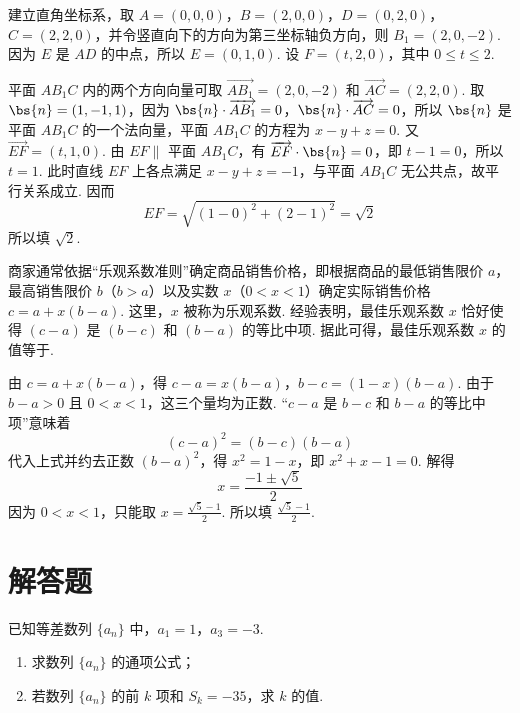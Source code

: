 
\begin{solution}
建立直角坐标系，取 \(A=(0,0,0)\)，\(B=(2,0,0)\)，\(D=(0,2,0)\)，\(C=(2,2,0)\)，并令竖直向下的方向为第三坐标轴负方向，则 \(B_1=(2,0,-2)\). 因为 \(E\) 是 \(AD\) 的中点，所以 \(E=(0,1,0)\). 设 \(F=(t,2,0)\)，其中 \(0\leqslant t\leqslant2\).

平面 \(AB_1C\) 内的两个方向向量可取 \(\overrightarrow{AB_1}=(2,0,-2)\) 和 \(\overrightarrow{AC}=(2,2,0)\). 取 \(\bs{n}=(1,-1,1)\)，因为 \(\bs{n}\cdot\overrightarrow{AB_1}=0\)，\(\bs{n}\cdot\overrightarrow{AC}=0\)，所以 \(\bs{n}\) 是平面 \(AB_1C\) 的一个法向量，平面 \(AB_1C\) 的方程为 \(x-y+z=0\). 又 \(\overrightarrow{EF}=(t,1,0)\). 由 \(EF\parallel\) 平面 \(AB_1C\)，有 \(\overrightarrow{EF}\cdot\bs{n}=0\)，即 \(t-1=0\)，所以 \(t=1\). 此时直线 \(EF\) 上各点满足 \(x-y+z=-1\)，与平面 \(AB_1C\) 无公共点，故平行关系成立. 因而
\[
EF=\sqrt{(1-0)^2+(2-1)^2}=\sqrt2
\]
所以填 \(\sqrt2\).
\end{solution}

\begin{problem}
商家通常依据“乐观系数准则”确定商品销售价格，即根据商品的最低销售限价 \(a\)，最高销售限价 \(b\)（\(b > a\)）以及实数 \(x\)（\(0 < x < 1\)）确定实际销售价格 \( c = a + x (b - a) \). 这里，\(x\) 被称为乐观系数. 经验表明，最佳乐观系数 \(x\) 恰好使得 \( (c - a) \) 是 \( (b - c) \) 和 \( (b - a) \) 的等比中项. 据此可得，最佳乐观系数 \(x\) 的值等于\fillinblank{}.
\end{problem}


\begin{solution}
由 \(c=a+x(b-a)\)，得 \(c-a=x(b-a)\)，\(b-c=(1-x)(b-a)\). 由于 \(b-a>0\) 且 \(0<x<1\)，这三个量均为正数. “\(c-a\) 是 \(b-c\) 和 \(b-a\) 的等比中项”意味着
\[
(c-a)^2=(b-c)(b-a)
\]
代入上式并约去正数 \((b-a)^2\)，得 \(x^2=1-x\)，即 \(x^2+x-1=0\). 解得
\[
x=\frac{-1\pm\sqrt5}{2}
\]
因为 \(0<x<1\)，只能取 \(x=\frac{\sqrt5-1}{2}\). 所以填 \(\frac{\sqrt5-1}{2}\).
\end{solution}

\section{解答题}

\begin{problem}
已知等差数列 \(\{a_{n}\}\) 中，\(a_{1} = 1\)，\(a_{3} = -3\).

\begin{enumerate}
\item 求数列 \( \{a_{n}\} \) 的通项公式；
\item 若数列 \( \{a_{n}\} \) 的前 \(k\) 项和 \( S_{k} = -35 \)，求 \(k\) 的值.
\end{enumerate}
\end{problem}

